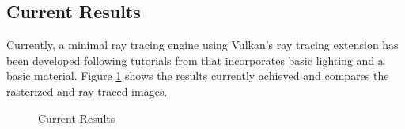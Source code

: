 \documentclass[conference]{IEEEtran}
\begin{document}
\subsection{Current Results}
Currently, a minimal ray tracing engine using Vulkan's ray tracing extension has been developed following tutorials from \cite{NVIDIA_Vulkan_Ray_Tracing_Tutorial} that incorporates basic lighting and a basic material. Figure \ref{fig:results} shows the results currently achieved and compares the rasterized and ray traced images. 
\begin{figure}%
    \centering
    \qquad
    \caption{Current Results}%
    \label{fig:results}%
\end{figure}
\printbibliography[heading=bibintoc,title={References}]
\end{document}
